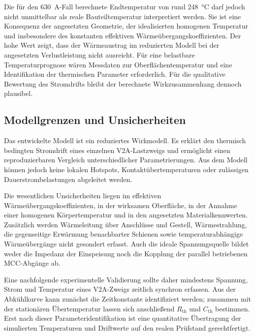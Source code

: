 Die für den \SI{630}{\ampere}-Fall berechnete Endtemperatur von rund
\SI{248}{\degreeCelsius} darf jedoch nicht unmittelbar als reale
Bauteiltemperatur interpretiert werden. Sie ist eine Konsequenz der angesetzten
Geometrie, der idealisierten homogenen Temperatur und insbesondere des
konstanten effektiven Wärmeübergangskoeffizienten. Der hohe Wert zeigt, dass
der Wärmeaustrag im reduzierten Modell bei der angesetzten Verlustleistung
nicht ausreicht. Für eine belastbare Temperaturprognose wären Messdaten zur
Oberflächentemperatur und eine Identifikation der thermischen Parameter
erforderlich. Für die qualitative Bewertung des Stromdrifts bleibt der
berechnete Wirkzusammenhang dennoch plausibel.


\subsection{Modellgrenzen und Unsicherheiten}
\label{sec:modellgrenzen_unsicherheiten}

Das entwickelte Modell ist ein reduziertes Wirkmodell. Es erklärt den
thermisch bedingten Stromdrift eines einzelnen V2A-Lastzweigs und ermöglicht
einen reproduzierbaren Vergleich unterschiedlicher Parametrierungen. Aus dem
Modell können jedoch keine lokalen Hotspots, Kontaktübertemperaturen oder
zulässigen Dauerstrombelastungen abgeleitet werden.

Die wesentlichen Unsicherheiten liegen im effektiven
Wärmeübergangskoeffizienten, in der wirksamen Oberfläche, in der Annahme einer
homogenen Körpertemperatur und in den angesetzten Materialkennwerten. Zusätzlich
werden Wärmeleitung über Anschlüsse und Gestell, Wärmestrahlung, die
gegenseitige Erwärmung benachbarter Schienen sowie temperaturabhängige
Wärmeübergänge nicht gesondert erfasst. Auch die ideale Spannungsquelle bildet
weder die Impedanz der Einspeisung noch die Kopplung der parallel betriebenen
MCC-Abgänge ab.

Eine nachfolgende experimentelle Validierung sollte daher mindestens Spannung,
Strom und Temperatur eines V2A-Zweigs zeitlich synchron erfassen. Aus der
Abkühlkurve kann zunächst die Zeitkonstante identifiziert werden; zusammen mit
der stationären Übertemperatur lassen sich anschließend
\(R_{\mathrm{th}}\) und \(C_{\mathrm{th}}\) bestimmen. Erst nach dieser
Parameteridentifikation ist eine quantitative Übertragung der simulierten
Temperaturen und Driftwerte auf den realen Prüfstand gerechtfertigt.
